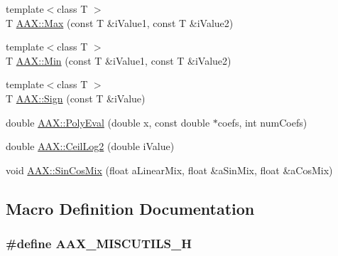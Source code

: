 \begin{DoxyCompactItemize}
\item 
{\footnotesize template$<$class T $>$ }\\T \hyperlink{a00288_a55ac62cf1b543338c58f8dd0d747c56c}{A\+A\+X\+::\+Max} (const T \&i\+Value1, const T \&i\+Value2)
\item 
{\footnotesize template$<$class T $>$ }\\T \hyperlink{a00288_a38c17ad30c1eb394bfa06e662d8d2598}{A\+A\+X\+::\+Min} (const T \&i\+Value1, const T \&i\+Value2)
\item 
{\footnotesize template$<$class T $>$ }\\T \hyperlink{a00288_ab6a3e1aef81cd84dec2eee9a27755bb0}{A\+A\+X\+::\+Sign} (const T \&i\+Value)
\item 
double \hyperlink{a00288_aa0094a6a87ca0c48f58b48ce5eea636e}{A\+A\+X\+::\+Poly\+Eval} (double x, const double $\ast$coefs, int num\+Coefs)
\item 
double \hyperlink{a00288_aad5df8c4502619ca12136a2f7b8d8a06}{A\+A\+X\+::\+Ceil\+Log2} (double i\+Value)
\item 
void \hyperlink{a00288_a3826233eb62186c03bb093f1031ca8f4}{A\+A\+X\+::\+Sin\+Cos\+Mix} (float a\+Linear\+Mix, float \&a\+Sin\+Mix, float \&a\+Cos\+Mix)
\end{DoxyCompactItemize}


\subsection{Macro Definition Documentation}
\hypertarget{a00271_a89034ace563ff82face40a019fc93063}{}
\subsubsection[{A\+A\+X\+\_\+\+M\+I\+S\+C\+U\+T\+I\+L\+S\+\_\+\+H}]{\setlength{\rightskip}{0pt plus 5cm}\#define A\+A\+X\+\_\+\+M\+I\+S\+C\+U\+T\+I\+L\+S\+\_\+\+H}\label{a00271_a89034ace563ff82face40a019fc93063}
\hypertarget{a00271_a7eb399409be7572c8bd589395c450cdc}{}
